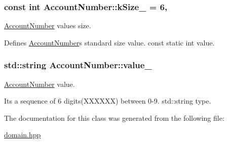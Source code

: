 \subsubsection[{\texorpdfstring{k\+Size\+\_\+}{kSize_}}]{\setlength{\rightskip}{0pt plus 5cm}const int Account\+Number\+::k\+Size\+\_\+ = 6\hspace{0.3cm}{\ttfamily [static]}, {\ttfamily [private]}}\hypertarget{classAccountNumber_aa70d40dba69a81e22dbaf6005e2dde48}{}\label{classAccountNumber_aa70d40dba69a81e22dbaf6005e2dde48}


\hyperlink{classAccountNumber}{Account\+Number} value\textquotesingle{}s size. 

Defines \hyperlink{classAccountNumber}{Account\+Number}\textquotesingle{}s standard size value. const static int value. 
\subsubsection[{\texorpdfstring{value\+\_\+}{value_}}]{\setlength{\rightskip}{0pt plus 5cm}std\+::string Account\+Number\+::value\+\_\+\hspace{0.3cm}{\ttfamily [private]}}\hypertarget{classAccountNumber_a3fc2214ec003f7f3aad3419ac71d6605}{}\label{classAccountNumber_a3fc2214ec003f7f3aad3419ac71d6605}


\hyperlink{classAccountNumber}{Account\+Number} value. 

It\textquotesingle{}s a sequence of 6 digits(\+X\+X\+X\+X\+X\+X) between 0-\/9. std\+::string type. 

The documentation for this class was generated from the following file\+:\begin{DoxyCompactItemize}
\item 
\hyperlink{domain_8hpp}{domain.\+hpp}\end{DoxyCompactItemize}
